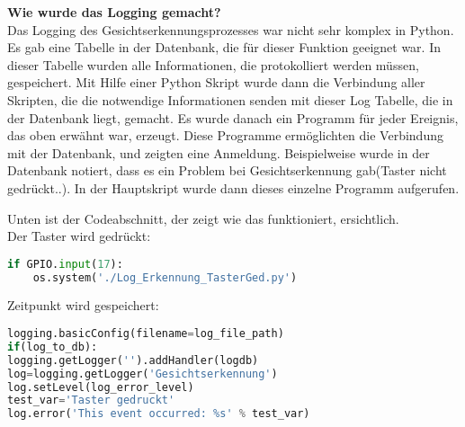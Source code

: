 \textbf{Wie wurde das Logging gemacht?}\\
Das Logging des Gesichtserkennungsprozesses war nicht sehr komplex in Python. Es gab eine Tabelle in der Datenbank, die für dieser Funktion geeignet war. In dieser Tabelle wurden alle Informationen, die protokolliert werden müssen, gespeichert. Mit Hilfe einer Python Skript wurde dann die Verbindung aller Skripten, die die notwendige Informationen senden mit dieser Log Tabelle, die in der Datenbank liegt, gemacht. Es wurde danach ein Programm für jeder Ereignis, das oben erwähnt war, erzeugt. Diese Programme ermöglichten die Verbindung mit der Datenbank, und zeigten eine Anmeldung. Beispielweise wurde in der Datenbank notiert, dass es ein Problem bei Gesichtserkennung gab(Taster nicht gedrückt..). In der Hauptskript wurde dann dieses einzelne Programm aufgerufen.

Unten ist der Codeabschnitt, der zeigt wie das funktioniert, ersichtlich.\\

Der Taster wird gedrückt: \\

\begin{lstlisting}[language=Python]
	if GPIO.input(17):
	os.system('./Log_Erkennung_TasterGed.py')
\end{lstlisting}

Zeitpunkt wird gespeichert: \\

\begin{lstlisting}[language=Python]
logging.basicConfig(filename=log_file_path)
if(log_to_db):
logging.getLogger('').addHandler(logdb)
log=logging.getLogger('Gesichtserkennung')
log.setLevel(log_error_level)
test_var='Taster gedruckt'
log.error('This event occurred: %s' % test_var)
\end{lstlisting}

